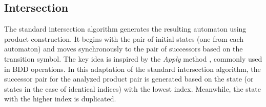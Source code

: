 \documentclass[pdflatex,sn-mathphys-num]{sn-jnl}%
\theoremstyle{thmstyleone}%
\theoremstyle{thmstyletwo}%
\theoremstyle{thmstylethree}%
\begin{document}
    \subsection{Intersection}
        The standard intersection algorithm generates the resulting automaton using product construction. It begins with the pair of initial states (one from each automaton) and moves synchronously to the pair of successors based on the transition symbol. The key idea is inspired by the \textit{Apply} method \cite{APPLY}, commonly used in BDD operations. In this adaptation of the standard intersection algorithm, the successor pair for the analyzed product pair is generated based on the state (or states in the case of identical indices) with the lowest index. Meanwhile, the state with the higher index is duplicated.

        \vspace*{-1em}
\end{document}
